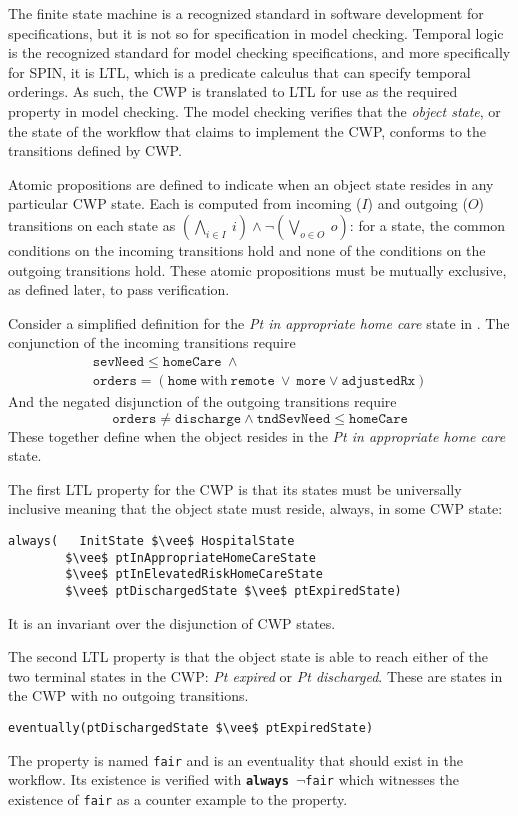 The finite state machine is a recognized standard in software development for specifications, but it is not so for specification in model checking.
Temporal logic is the recognized standard for model checking specifications, and more specifically for SPIN, it is LTL, which is a predicate calculus that can specify temporal orderings.
As such, the CWP is translated to LTL for use as the required property in model checking.
The model checking verifies that the \emph{object state}, or the state of the workflow that claims to implement the CWP, conforms to the transitions defined by CWP.

Atomic propositions are defined to indicate when an object state resides in any particular CWP state.
Each is computed from incoming ($I$) and outgoing ($O$) transitions on each state as $(\bigwedge_{i \in I}\ i) \wedge \neg(\bigvee_{o \in O}\ o)$: for a state, the common conditions on the incoming transitions hold and none of the conditions on the outgoing transitions hold.
These atomic propositions must be mutually exclusive, as defined later, to pass verification.

Consider a simplified definition for the \emph{Pt in appropriate home care} state in . The conjunction of the incoming transitions require
%
\[
\begin{array}{l}
  \mathtt{sevNeed} \le \mathtt{homeCare}\ \wedge\ \\
  \mathtt{orders} = (\mathtt{home}\ \mathrm{with}\ \mathtt{remote}\ \vee\ 
                    \mathtt{more} \vee \mathtt{adjustedRx})
\end{array}
\]
%
And the negated disjunction of the outgoing transitions require
%
\[
  \mathtt{orders} \neq \mathtt{discharge} \wedge \mathtt{tndSevNeed} \le \mathtt{homeCare}
\]
%
\noindent These together define when the object resides in the \emph{Pt in appropriate home care} state.

The first LTL property for the CWP is that its states must be universally inclusive meaning that the object state must reside, always, in some CWP state:
%
{\small
\begin{lstlisting}[style=myPromela,mathescape=true]
always(   InitState $\vee$ HospitalState 
        $\vee$ ptInAppropriateHomeCareState 
        $\vee$ ptInElevatedRiskHomeCareState 
        $\vee$ ptDischargedState $\vee$ ptExpiredState)
\end{lstlisting}
}
%
\noindent It is an invariant over the disjunction of CWP states.

The second LTL property is that the object state is able to reach either of the two terminal states in the CWP: \emph{Pt expired} or \emph{Pt discharged}.
These are states in the CWP with no outgoing transitions.
%
{\small
\begin{lstlisting}[style=myPromela,mathescape=true]
eventually(ptDischargedState $\vee$ ptExpiredState)
\end{lstlisting}
}
%
\noindent The property is named \texttt{fair} and is an eventuality that should exist in the workflow.
Its existence is verified with \texttt{\textbf{always} $\neg$fair} which witnesses the existence of \texttt{fair} as a counter example to the property.


